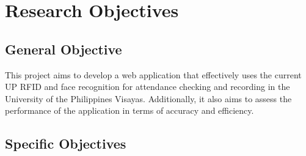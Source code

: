 \section{Research Objectives}
\label{sec:researchobjectives}

\subsection{General Objective}
\label{sec:generalobjective}

This project aims to develop a web application that effectively uses the current UP RFID and face recognition for attendance checking and recording in the University of the Philippines Visayas. Additionally, it also aims to assess the performance of the application in terms of accuracy and efficiency.



\subsection{Specific Objectives}
\label{sec:specificobjectives}

%
%

\begin{comment}
	

This subsection is an elaboration of the general objective.  
It states the specific steps that must be undertaken to accomplish the general objective.  
These objectives must be \textbf{S}pecific, \textbf{M}easurable, \textbf{A}ttainable, \textbf{R}ealistic, \textbf{T}ime-bounded. Also, they are manageable and communicable.  

A specific objective start with ``to $<$verb$>$'' for example: to design/survey/review/analyze.

Studying a particular programming language or development tool (e.g., to study Windows/Object-Oriented/Graphics/C++ programming) to  accomplish the general objective is inherent in all thesis and, therefore, must not be included here.
\end{comment}

